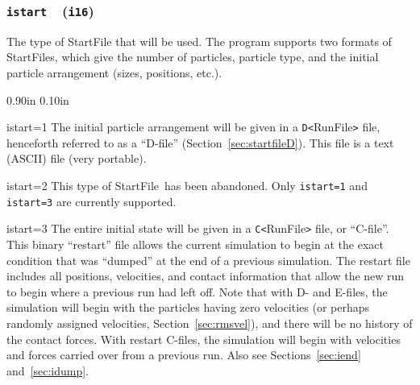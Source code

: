 \documentclass[letterpaper,11pt]{article}
\newcommand{\Var}[2]{\texttt{#1}\ \  (\texttt{#2})}
\newcommand{\StartFile}{\textsf{StartFile}}
\newlength{\Labelwidth}
\newcommand{\Entrylabel}[1]{\makebox[\Labelwidth][r]{\texttt{#1}}}
\newenvironment{Options}
{\begin{list}{}{%
\renewcommand{\makelabel}{\Entrylabel}%
\setlength{\leftmargin} {0.90in}%
\setlength{\rightmargin}{0.00in}%
\setlength{\labelsep}   {0.10in}%
\setlength{\labelwidth} {\Labelwidth}%
}}
{\end{list}}
\begin{document}
\subsubsection[\texttt{istart}]{\Var{istart}{i16}}\label{sec:istart}
The type of \textsf{StartFile} that will be used.
The program supports two formats
of \textsf{StartFile}s, which give
the number of particles, particle type,
and the initial particle arrangement (sizes, positions, etc.).
\begin{Options}
\item[istart=1]
The initial particle arrangement will be given in a 
\mbox{\texttt{D<}\textsf{RunFile}\texttt{>}} file,
henceforth referred to as a ``D-file'' (Section~\ref{sec:startfileD}).
This file is a text (ASCII) file (very portable).
\item[istart=2]
This type of \StartFile\ has been abandoned.
Only \texttt{istart=1} and \texttt{istart=3} are currently
supported.
\item[istart=3]
The entire initial state will be given in a 
\mbox{\texttt{C<}\textsf{RunFile}\texttt{>}} file,
or ``C-file''.
This binary ``restart'' file allows the current simulation
to begin at the exact condition
that was ``dumped'' at the end of a previous simulation.  
The restart file includes all positions,
velocities, and contact information that allow the new run to begin
where a previous run had left off.
Note that with D- and E-files, the simulation will begin
with the particles having zero velocities
(or perhaps randomly assigned
velocities, Section~\ref{sec:rmsvel}),
and there will be no history of the contact
forces.
With restart C-files, the simulation will begin with velocities
and forces carried over from a previous run.
Also see Sections~\ref{sec:iend} and~\ref{sec:idump}.
\end{Options}
%
\end{document}
